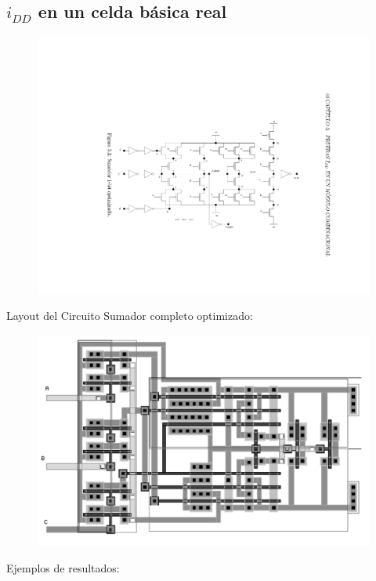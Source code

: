 \documentclass[
paper=128mm:96mm, %
fontsize=11pt, %
pagesize, %
parskip=half-, %
]{scrartcl} %
\theoremstyle{mythmstyle} %
\begin{document}
\clearpage

\subsection{$i_{DD}$ en un celda básica real}
\label{sec:adder}

\begin{figure}[h]
  \centering\includegraphics[width=0.65\linewidth]{fullAdder}
\end{figure}

\clearpage

Layout del Circuito Sumador completo optimizado:

\begin{figure}[h]
  \centering\includegraphics[width=0.65\linewidth]{adder8}
\end{figure}

\clearpage

Ejemplos de resultados:
\end{document}
